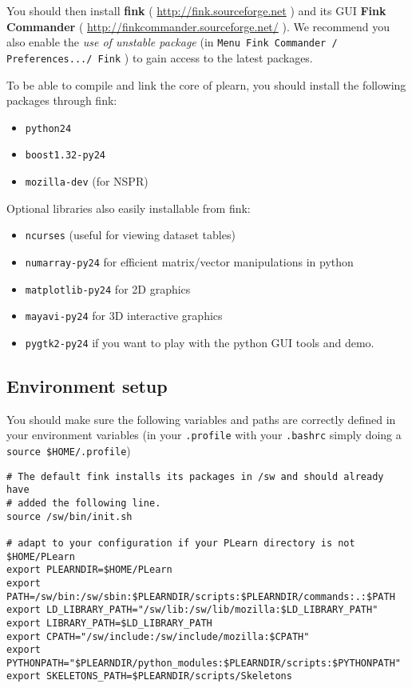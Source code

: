 \documentclass[11pt]{book}
\begin{document}
You should then install {\bf fink} ( \url{http://fink.sourceforge.net} )
and its GUI {\bf Fink Commander} ( \url{http://finkcommander.sourceforge.net/} ).
We recommend you also enable the {\em use of unstable package} (in {\tt Menu Fink
Commander / Preferences.../ Fink} ) to gain access to the latest packages.

To be able to compile and link the core of plearn, you should install the
following packages through fink:
\begin{itemize}
\item {\tt python24}
\item {\tt boost1.32-py24}
\item {\tt mozilla-dev} (for NSPR)
\end{itemize}

Optional libraries also easily installable from fink:
\begin{itemize}
\item {\tt ncurses}  (useful for viewing dataset tables)
\item {\tt numarray-py24} for efficient matrix/vector manipulations in python
\item {\tt matplotlib-py24} for 2D graphics
\item {\tt mayavi-py24} for 3D interactive graphics
\item {\tt pygtk2-py24} if you want to play with the
  python GUI tools and demo.
\end{itemize}


\subsection{Environment setup}

You should make sure the following variables and paths are correctly defined in your
environment variables (in your {\tt .profile} with your {\tt .bashrc}
simply doing a \verb!source $HOME/.profile!)

\begin{verbatim}
# The default fink installs its packages in /sw and should already have
# added the following line.
source /sw/bin/init.sh

# adapt to your configuration if your PLearn directory is not $HOME/PLearn
export PLEARNDIR=$HOME/PLearn
export PATH=/sw/bin:/sw/sbin:$PLEARNDIR/scripts:$PLEARNDIR/commands:.:$PATH
export LD_LIBRARY_PATH="/sw/lib:/sw/lib/mozilla:$LD_LIBRARY_PATH"
export LIBRARY_PATH=$LD_LIBRARY_PATH
export CPATH="/sw/include:/sw/include/mozilla:$CPATH"
export PYTHONPATH="$PLEARNDIR/python_modules:$PLEARNDIR/scripts:$PYTHONPATH"
export SKELETONS_PATH=$PLEARNDIR/scripts/Skeletons
\end{verbatim}
\end{document}
